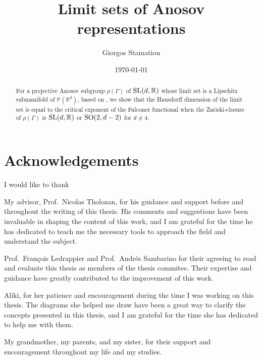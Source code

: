 \documentclass{report}
\title{Limit sets of Anosov representations}
\author{Giorgos Stamatiou}
\date{\today}
\begin{document}
\listoftodos

\maketitle


\begin{abstract}
    For a projective Anosov subgroup $\rho(\Gamma)$ of $\operatorname{{\mathrm{SL}}}(d, \mathbb R)$ whose limit set is a Lipschitz submanifold of $\mathbb P(\mathbb R^d)$, based on \cite{pozzetti_anosov_2023}, we show that the Hausdorff dimension of the limit set is equal to the critical exponent of the Falconer functional when the Zariski-closure of $\rho(\Gamma)$ is $\operatorname{{\mathrm{SL}}}(d, \mathbb R)$ or $\operatorname{{\mathrm{SO}}}(2, d-2)$ for $d \neq 4$. 
\end{abstract}

\tableofcontents

\chapter*{Acknowledgements}
I would like to thank

My advisor, Prof.\ Nicolas Tholozan, for his guidance and support before and throughout the writing of this thesis.
His comments and suggestions have been invaluable in shaping the content of this work, and I am grateful for the time he has dedicated to teach me the necessary tools to approach the field and understand the subject.

Prof.\ François Ledrappier and Prof.\ Andrés Sambarino for their agreeing to read and evaluate this thesis as members of the thesis commitee. Their expertise and guidance have greatly contributed to the improvement of this work.

Aliki, for her patience and encouragement during the time I was working on this thesis.
The diagrams she helped me draw have been a great way to clarify the concepts presented in this thesis, and I am grateful for the time she has dedicated to help me with them.

My grandmother, my parents, and my sister, for their support and encouragement throughout my life and my studies.
\end{document}
